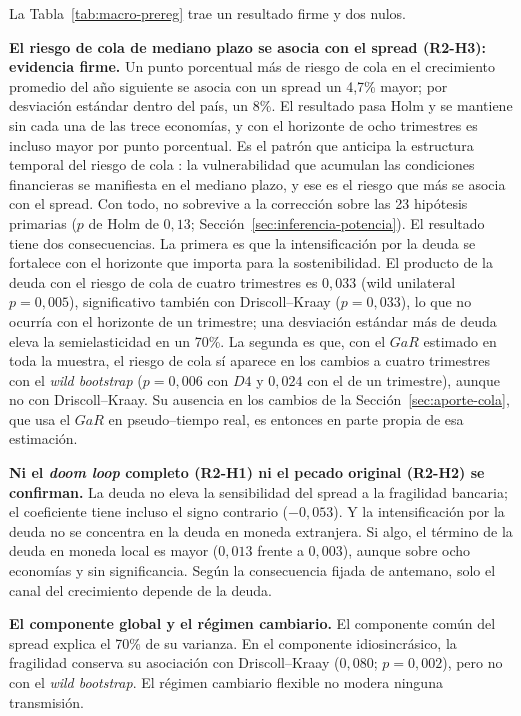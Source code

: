 La Tabla~\ref{tab:macro-prereg} trae un resultado firme y dos nulos.

\textbf{El riesgo de cola de mediano plazo se asocia con el spread (R2-H3): evidencia firme.} Un punto porcentual más de riesgo de cola en el crecimiento promedio del año siguiente se asocia con un spread un 4,7\% mayor; por desviación estándar dentro del país, un 8\%. El resultado pasa Holm y se mantiene sin cada una de las trece economías, y con el horizonte de ocho trimestres es incluso mayor por punto porcentual. Es el patrón que anticipa la estructura temporal del riesgo de cola \citep{AdrianEtAl2022}: la vulnerabilidad que acumulan las condiciones financieras se manifiesta en el mediano plazo, y ese es el riesgo que más se asocia con el spread. Con todo, no sobrevive a la corrección sobre las 23 hipótesis primarias ($p$ de Holm de $0{,}13$; Sección~\ref{sec:inferencia-potencia}). El resultado tiene dos consecuencias. La primera es que la intensificación por la deuda se fortalece con el horizonte que importa para la sostenibilidad. El producto de la deuda con el riesgo de cola de cuatro trimestres es $0{,}033$ (wild unilateral $p=0{,}005$), significativo también con Driscoll--Kraay ($p=0{,}033$), lo que no ocurría con el horizonte de un trimestre; una desviación estándar más de deuda eleva la semielasticidad en un 70\%. La segunda es que, con el $GaR$ estimado en toda la muestra, el riesgo de cola sí aparece en los cambios a cuatro trimestres con el \textit{wild bootstrap} ($p=0{,}006$ con $D4$ y $0{,}024$ con el de un trimestre), aunque no con Driscoll--Kraay. Su ausencia en los cambios de la Sección~\ref{sec:aporte-cola}, que usa el $GaR$ en pseudo--tiempo real, es entonces en parte propia de esa estimación.

\textbf{Ni el \textit{doom loop} completo (R2-H1) ni el pecado original (R2-H2) se confirman.} La deuda no eleva la sensibilidad del spread a la fragilidad bancaria; el coeficiente tiene incluso el signo contrario ($-0{,}053$). Y la intensificación por la deuda no se concentra en la deuda en moneda extranjera. Si algo, el término de la deuda en moneda local es mayor ($0{,}013$ frente a $0{,}003$), aunque sobre ocho economías y sin significancia. Según la consecuencia fijada de antemano, solo el canal del crecimiento depende de la deuda.

\textbf{El componente global y el régimen cambiario.} El componente común del spread explica el 70\% de su varianza. En el componente idiosincrásico, la fragilidad conserva su asociación con Driscoll--Kraay ($0{,}080$; $p=0{,}002$), pero no con el \textit{wild bootstrap}. El régimen cambiario flexible no modera ninguna transmisión.

